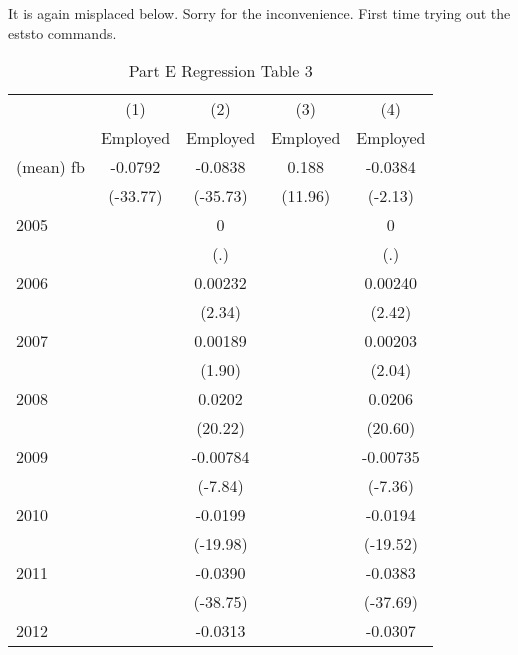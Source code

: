 \documentclass{article}
\begin{document}
\begin{enumerate}[label=\alph*]
It is again misplaced below. Sorry for the inconvenience. First time trying out the eststo commands. 

\begin{table}[htbp]\centering
\caption{Part E Regression Table 3\label{tab1}}
\begin{tabular}{l*{4}{c}}
\hline\hline
                    &\multicolumn{1}{c}{(1)}&\multicolumn{1}{c}{(2)}&\multicolumn{1}{c}{(3)}&\multicolumn{1}{c}{(4)}\\
                    &\multicolumn{1}{c}{Employed}&\multicolumn{1}{c}{Employed}&\multicolumn{1}{c}{Employed}&\multicolumn{1}{c}{Employed}\\
\hline
(mean) fb           &     -0.0792&     -0.0838&       0.188&     -0.0384\\
                    &    (-33.77)&    (-35.73)&     (11.96)&     (-2.13)\\
[1em]
2005                &            &           0&            &           0\\
                    &            &         (.)&            &         (.)\\
[1em]
2006                &            &     0.00232&            &     0.00240\\
                    &            &      (2.34)&            &      (2.42)\\
[1em]
2007                &            &     0.00189&            &     0.00203\\
                    &            &      (1.90)&            &      (2.04)\\
[1em]
2008                &            &      0.0202&            &      0.0206\\
                    &            &     (20.22)&            &     (20.60)\\
[1em]
2009                &            &    -0.00784&            &    -0.00735\\
                    &            &     (-7.84)&            &     (-7.36)\\
[1em]
2010                &            &     -0.0199&            &     -0.0194\\
                    &            &    (-19.98)&            &    (-19.52)\\
[1em]
2011                &            &     -0.0390&            &     -0.0383\\
                    &            &    (-38.75)&            &    (-37.69)\\
[1em]
2012                &            &     -0.0313&            &     -0.0307\\

\end{tabular}
\end{table}
\end{enumerate}
\end{document}
